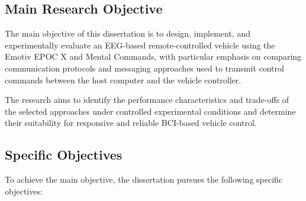 \subsection{Main Research Objective}

The main objective of this dissertation is to design, implement, and experimentally evaluate an EEG-based remote-controlled vehicle using the Emotiv EPOC X and Mental Commands, with particular emphasis on comparing communication protocols and messaging approaches used to transmit control commands between the host computer and the vehicle controller.

The research aims to identify the performance characteristics and trade-offs of the selected approaches under controlled experimental conditions and determine their suitability for responsive and reliable BCI-based vehicle control.

\subsection{Specific Objectives}

To achieve the main objective, the dissertation pursues the following specific objectives:

